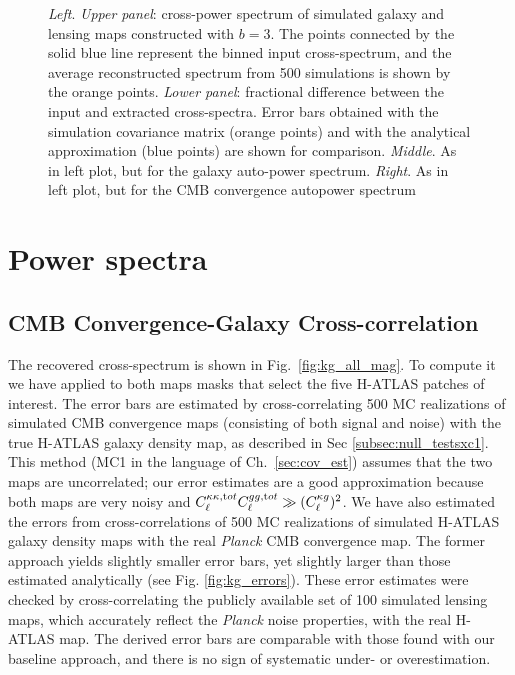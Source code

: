 \begin{figure}
\caption{\emph{Left}. \emph{Upper panel}: cross-power spectrum of simulated galaxy and lensing maps constructed with $b=3$. The points connected by the solid blue line represent the binned input cross-spectrum, and the average reconstructed spectrum from 500 simulations is shown by the orange points. \emph{Lower panel}:  fractional difference between the input and extracted cross-spectra. Error bars obtained with the simulation covariance matrix (orange points) and with the analytical approximation (blue points) are shown for comparison. \emph{Middle}. As in left plot, but for the galaxy auto-power spectrum. \emph{Right}. As in left plot, but for the \gls{CMB} convergence autopower spectrum}
\label{fig:validation}
\end{figure}


\section{Power spectra}
\label{sec:power_spectraxc1}

\subsection{CMB Convergence-Galaxy Cross-correlation}
\label{subsec:kg_resultsxc1}

The recovered cross-spectrum is shown in Fig.~\eqref{fig:kg_all_mag}.  To compute it we have applied to both maps masks that select the five H-ATLAS patches of interest. The error bars are estimated by cross-correlating 500 \gls{MC} realizations of simulated \gls{CMB} convergence maps (consisting of both signal and noise) with the true H-ATLAS galaxy density map, as described in Sec \eqref{subsec:null_testsxc1}. This method (\gls{MC}1 in the language of Ch.~\eqref{sec:cov_est}) assumes that the two maps are uncorrelated; our error estimates are a good approximation because both maps are very noisy and $C_{\ell}^{\kappa\kappa,\rm tot}C_{\ell}^{gg,\rm tot}\gg (C_{\ell}^{\kappa g})^2$. We have also estimated the errors from cross-correlations of 500 \gls{MC} realizations of simulated H-ATLAS galaxy density maps with the real \textit{Planck} \gls{CMB} convergence map. The former approach yields slightly smaller error bars, yet slightly larger than those estimated analytically (see Fig. \eqref{fig:kg_errors}). These error estimates were checked by cross-correlating  the publicly available set of 100 simulated lensing maps, which accurately reflect the \emph{Planck} noise properties, with the real H-ATLAS map. The derived error bars are comparable with those found with our baseline approach, and there is no sign of systematic under- or overestimation.

